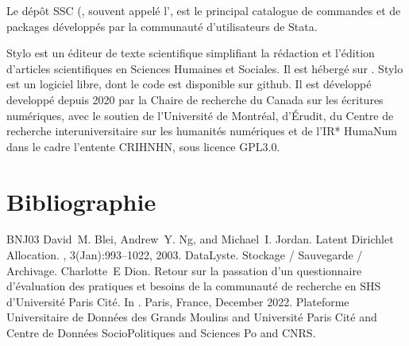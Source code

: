 \documentclass[letterpaper,10pt,english]{jupyterBook}
\begin{document}
\begin{description}
\sphinxAtStartPar
Le dépôt SSC (, souvent appelé l’, est le principal catalogue de commandes et de packages développés par la communauté d’utilisateurs de Stata.

\sphinxAtStartPar
Stylo est un éditeur de texte scientifique simplifiant la rédaction et l’édition d’articles scientifiques en Sciences Humaines et Sociales. Il est hébergé sur . Stylo est un logiciel libre, dont le code est disponible sur github. Il est développé developpé depuis 2020 par la Chaire de recherche du Canada sur les écritures numériques, avec le soutien de l’Université de Montréal, d’Érudit, du Centre de recherche interuniversitaire sur les humanités numériques et de l’IR* Huma\sphinxhyphen{}Num dans le cadre l’entente CRIHN\sphinxhyphen{}HN, sous licence GPL\sphinxhyphen{}3.0.

\end{description}

\sphinxstepscope


\chapter{Bibliographie}
\label{\detokenize{biblio:bibliographie}}\label{\detokenize{biblio::doc}}
\begin{sphinxthebibliography}{BNJ03}
\sphinxAtStartPar
David M. Blei, Andrew Y. Ng, and Michael I. Jordan. Latent Dirichlet Allocation. , 3(Jan):993–1022, 2003.
\sphinxAtStartPar
DataLyste. Stockage / Sauvegarde / Archivage.
\sphinxAtStartPar
Charlotte E Dion. Retour sur la passation d'un questionnaire d'évaluation des pratiques et besoins de la communauté de recherche en SHS d'Université Paris Cité. In . Paris, France, December 2022. Plateforme Universitaire de Données des Grands Moulins and Université Paris Cité and Centre de Données Socio\sphinxhyphen{}Politiques and Sciences Po and CNRS.
\end{sphinxthebibliography}







\renewcommand{\indexname}{Index}
\printindex
\end{document}
